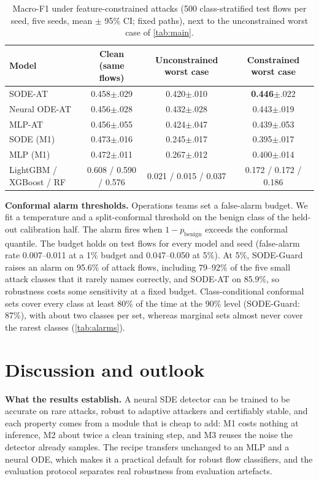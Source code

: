 \documentclass{article}
\theoremstyle{definition}
\newcommand{\ci}[1]{{\scriptsize$\pm$#1}}
\begin{document}
\begin{table}[t]
\caption{Macro-F1 under feature-constrained attacks (500 class-stratified test
flows per seed, five seeds, mean $\pm$ 95\% CI; fixed paths), next to the
unconstrained worst case of \cref{tab:main}.}
\label{tab:constrained}
\centering\footnotesize
\setlength{\tabcolsep}{4pt}
\begin{tabular}{lccc}
\toprule
Model & Clean (same flows) & Unconstrained worst case & Constrained worst case\\
\midrule
SODE-AT & 0.458\ci{.029} & 0.420\ci{.010} & \textbf{0.446}\ci{.022}\\
Neural ODE-AT & 0.456\ci{.028} & 0.432\ci{.028} & 0.443\ci{.019}\\
MLP-AT & 0.456\ci{.055} & 0.424\ci{.047} & 0.439\ci{.053}\\
SODE (M1) & 0.473\ci{.016} & 0.245\ci{.017} & 0.395\ci{.017}\\
MLP (M1) & 0.472\ci{.011} & 0.267\ci{.012} & 0.400\ci{.014}\\
LightGBM / XGBoost / RF & 0.608 / 0.590 / 0.576 & 0.021 / 0.015 / 0.037 & 0.172 / 0.172 / 0.186\\
\bottomrule
\end{tabular}
\end{table}

\textbf{Conformal alarm thresholds.} Operations teams set a false-alarm budget.
We fit a temperature \citep{guo2017calibration} and a split-conformal threshold
on the benign class of the held-out calibration half. The alarm fires when
$1-p_{\mathrm{benign}}$ exceeds the conformal quantile. The budget holds on
test flows for every model and seed (false-alarm rate 0.007--0.011 at a 1\%
budget and 0.047--0.050 at 5\%). At 5\%, SODE-Guard raises an alarm on 95.6\% of
attack flows, including 79--92\% of the five small attack classes that it
rarely names correctly, and SODE-AT on 85.9\%, so robustness costs some
sensitivity at a fixed budget. Class-conditional conformal sets
\citep{sadinle2019lac} cover every class at least 80\% of the time at the 90\%
level (SODE-Guard: 87\%), with about two classes per set, whereas marginal sets
almost never cover the rarest classes (\cref{tab:alarms}).

\section{Discussion and outlook}\label{sec:disc}
\textbf{What the results establish.} A neural SDE detector can be trained to be
accurate on rare attacks, robust to adaptive attackers and certifiably stable,
and each property comes from a module that is cheap to add: M1 costs nothing at
inference, M2 about twice a clean training step, and M3 reuses the noise the
detector already samples. The recipe transfers unchanged to an MLP and a neural
ODE, which makes it a practical default for robust flow classifiers, and the
evaluation protocol separates real robustness from evaluation artefacts.
\end{document}
